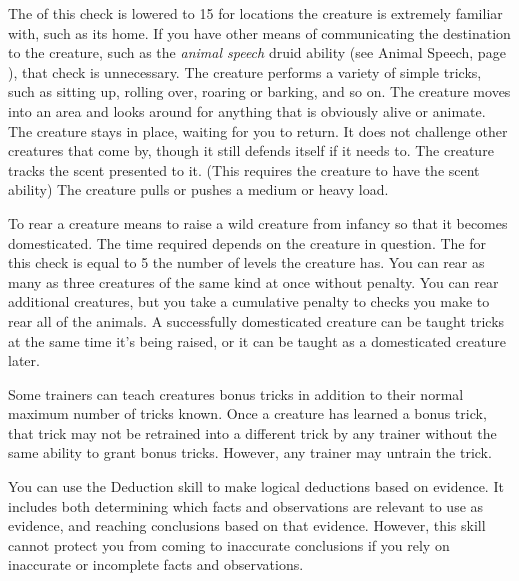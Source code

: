         The  of this check is lowered to 15 for locations the creature is extremely familiar with, such as its home.
        If you have other means of communicating the destination to the creature, such as the \textit{animal speech} druid ability (see Animal Speech, page ), that check is unnecessary.
         The creature performs a variety of simple tricks, such as sitting up, rolling over, roaring or barking, and so on.
         The creature moves into an area and looks around for anything that is obviously alive or animate.
         The creature stays in place, waiting for you to return. It does not challenge other creatures that come by, though it still defends itself if it needs to.
         The creature tracks the scent presented to it. (This requires the creature to have the scent ability)
         The creature pulls or pushes a medium or heavy load.

         To rear a creature means to raise a wild creature from infancy so that it becomes domesticated. The time required depends on the creature in question. The  for this check is equal to 5 \add the number of levels the creature has. You can rear as many as three creatures of the same kind at once without penalty. You can rear additional creatures, but you take a cumulative  penalty to checks you make to rear all of the animals. A successfully domesticated creature can be taught tricks at the same time it's being raised, or it can be taught as a domesticated creature later.

        \label{Bonus Tricks} Some trainers can teach creatures bonus tricks in addition to their normal maximum number of tricks known.
        Once a creature has learned a bonus trick, that trick may not be retrained into a different trick by any trainer without the same ability to grant bonus tricks.
        However, any trainer may untrain the trick.

\newpage
{}
    You can use the Deduction skill to make logical deductions based on evidence.
    It includes both determining which facts and observations are relevant to use as evidence, and reaching conclusions based on that evidence.
    However, this skill cannot protect you from coming to inaccurate conclusions if you rely on inaccurate or incomplete facts and observations.

